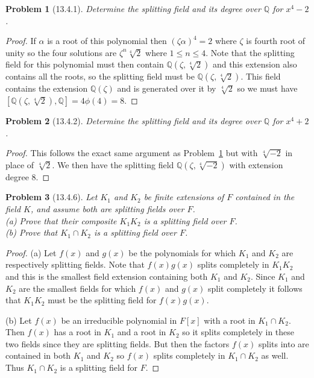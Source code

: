 \documentclass{article}
\newtheorem{problem}{Problem}
\begin{document}

\begin{problem}[13.4.1]
\label{four}
Determine the splitting field and its degree over $\mathbb{Q}$ for $x^4 - 2$.
\end{problem}
\begin{proof}
If $\alpha$ is a root of this polynomial then $(\zeta \alpha)^{4} = 2$ where $\zeta$ is fourth root of unity so the four solutions are $\zeta^n \sqrt[4]{2}$ where $1 \leq n \leq 4$. Note that the splitting field for this polynomial must then contain $\mathbb{Q}(\zeta, \sqrt[4]{2})$ and this extension also contains all the roots, so the splitting field must be $\mathbb{Q}(\zeta, \sqrt[4]{2})$. This field contains the extension $\mathbb{Q}(\zeta)$ and is generated over it by $\sqrt[4]{2}$ so we must have $[\mathbb{Q}(\zeta, \sqrt[4]{2}), \mathbb{Q}] = 4\phi(4) = 8$.
\end{proof}

\begin{problem}[13.4.2]
Determine the splitting field and its degree over $\mathbb{Q}$ for $x^4 + 2$.
\end{problem}
\begin{proof}
This follows the exact same argument as Problem~\ref{four} but with $\sqrt[4]{-2}$ in place of $\sqrt[4]{2}$. We then have the splitting field $\mathbb{Q}(\zeta, \sqrt[4]{-2})$ with extension degree $8$.
\end{proof}

\begin{problem}[13.4.6]
Let $K_1$ and $K_2$ be finite extensions of $F$ contained in the field $K$, and assume both are splitting fields over $F$.\\
(a) Prove that their composite $K_1K_2$ is a splitting field over $F$.\\
(b) Prove that $K_1 \cap K_2$ is a splitting field over $F$.
\end{problem}
\begin{proof}
(a) Let $f(x)$ and $g(x)$ be the polynomials for which $K_1$ and $K_2$ are respectively splitting fields. Note that $f(x)g(x)$ splits completely in $K_1K_2$ and this is the smallest field extension containing both $K_1$ and $K_2$. Since $K_1$ and $K_2$ are the smallest fields for which $f(x)$ and $g(x)$ split completely it follows that $K_1K_2$ must be the splitting field for $f(x)g(x)$.

(b) Let $f(x)$ be an irreducible polynomial in $F[x]$ with a root in $K_1 \cap K_2$. Then $f(x)$ has a root in $K_1$ and a root in $K_2$ so it splits completely in these two fields since they are splitting fields. But then the factors $f(x)$ splits into are contained in both $K_1$ and $K_2$ so $f(x)$ splits completely in $K_1 \cap K_2$ as well. Thus $K_1 \cap K_2$ is a splitting field for $F$.
\end{proof}
\end{document}
